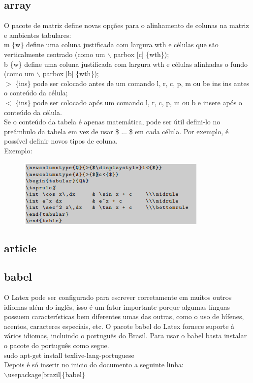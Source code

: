 \documentclass[12pt]{article}
\begin{document}
		\subsection{array}
			O pacote de matriz define novas opções para o alinhamento de colunas na matriz e
			ambientes tabulares: \\
			m \{{w}\} define uma coluna justificada com largura wth e células que são verticalmente
			centrado (como um $\backslash$ parbox [c] \{{wth}\}); \\
			b \{{w}\} define uma coluna justificada com largura wth e células alinhadas
			o fundo (como um $\backslash$ parbox [b] \{{wth}\}); \\
			$>$ \{{ins}\} pode ser colocado antes de um comando l, r, c, p, m ou be ins ins antes
			o conteúdo da célula; \\
			$<$ \{{ins}\} pode ser colocado após um comando l, r, c, p, m ou b e insere após o
			conteúdo da célula. \\
			Se o conteúdo da tabela é apenas matemática, pode ser útil defini-lo no
			preâmbulo da tabela em vez de usar \$ ... \$ em cada célula. Por exemplo, é
			possível definir novos tipos de coluna. \\
			Exemplo:
			\begin{figure}[h]
				\centering
				\includegraphics[scale=0.8]{1i.png}
			\end{figure}
		
		\subsection{article}
			
		
		\subsection{babel}
			O Latex pode ser configurado para escrever corretamente em muitos outros idiomas além do inglês, isso é um fator importante porque algumas línguas possuem características bem diferentes umas das outras, como o uso de hífenes, acentos, caracteres especiais, etc. O pacote babel do Latex fornece suporte à vários idiomas, incluindo o português do Brasil.
			Para usar o babel basta instalar o pacote do português como segue. \\
			sudo apt-get install texlive-lang-portuguese \\
			Depois é só inserir no inicio do documento a seguinte linha: \\
			$\backslash$usepackage[brazil]\{{babel}\}
		
\end{document}
